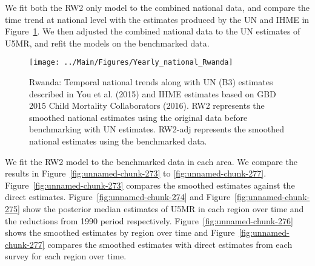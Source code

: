 \documentclass[12pt]{article}\usepackage[]{graphicx}\usepackage[]{color}
\newenvironment{knitrout}{}{} %
\begin{document}
We fit both the RW2 only model to the combined national data, and compare the time trend at national level with the estimates produced by the UN and IHME in Figure~\ref{fig:unnamed-chunk-272}. We then adjusted the combined national data to the UN estimates of U5MR, and refit the models on the benchmarked data. 

\begin{knitrout}
\color{fgcolor}\begin{figure}[bht]

{\centering \texttt{[image: ../Main/Figures/Yearly\_national\_Rwanda]} 

}

\caption[Rwanda]{Rwanda: Temporal national trends along with UN (B3) estimates described in You et al. (2015) and IHME estimates based on GBD 2015 Child Mortality Collaborators (2016). RW2 represents the smoothed national estimates using the original data before benchmarking with UN estimates. RW2-adj represents the smoothed national estimates using the benchmarked data.}\label{fig:unnamed-chunk-272}
\end{figure}


\end{knitrout}
 

We fit the RW2 model to the benchmarked data in each area. 
We compare the results in Figure~\ref{fig:unnamed-chunk-273} to \ref{fig:unnamed-chunk-277}.
Figure~\ref{fig:unnamed-chunk-273} compares the smoothed estimates against the direct estimates. Figure~\ref{fig:unnamed-chunk-274} and Figure~\ref{fig:unnamed-chunk-275} show the posterior median estimates of U5MR in each region over time and the reductions from 1990 period respectively.
Figure~\ref{fig:unnamed-chunk-276} shows the smoothed estimates by region over time and Figure~\ref{fig:unnamed-chunk-277} compares the smoothed estimates with direct estimates from each survey for each region over time.




\end{document}

